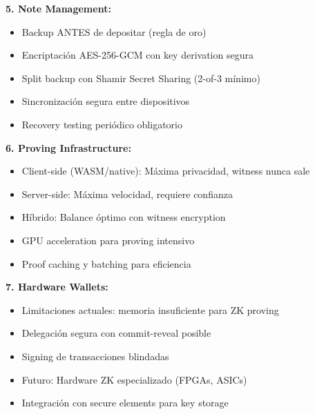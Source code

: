 \documentclass[11pt,a4paper,twoside]{book}
\theoremstyle{definition}
\theoremstyle{remark}
\begin{document}
\begin{keyidea}
\textbf{5. Note Management:}
\begin{itemize}
    \item Backup ANTES de depositar (regla de oro)
    \item Encriptación AES-256-GCM con key derivation segura
    \item Split backup con Shamir Secret Sharing (2-of-3 mínimo)
    \item Sincronización segura entre dispositivos
    \item Recovery testing periódico obligatorio
\end{itemize}

\textbf{6. Proving Infrastructure:}
\begin{itemize}
    \item Client-side (WASM/native): Máxima privacidad, witness nunca sale
    \item Server-side: Máxima velocidad, requiere confianza
    \item Híbrido: Balance óptimo con witness encryption
    \item GPU acceleration para proving intensivo
    \item Proof caching y batching para eficiencia
\end{itemize}

\textbf{7. Hardware Wallets:}
\begin{itemize}
    \item Limitaciones actuales: memoria insuficiente para ZK proving
    \item Delegación segura con commit-reveal posible
    \item Signing de transacciones blindadas
    \item Futuro: Hardware ZK especializado (FPGAs, ASICs)
    \item Integración con secure elements para key storage
\end{itemize}
\end{keyidea}
\end{document}
